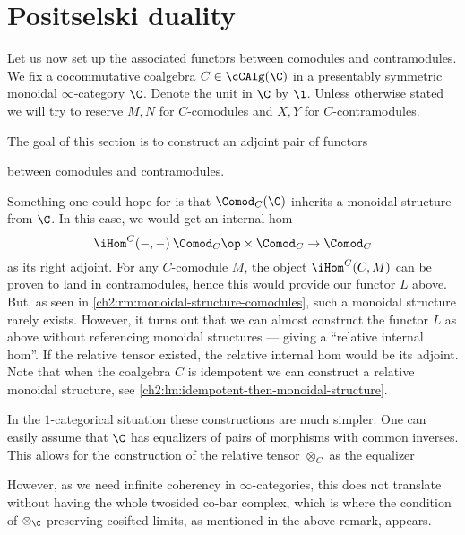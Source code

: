 

\section{Positselski duality}

Let us now set up the associated functors between comodules and contramodules. We fix a cocommutative coalgebra $C\in \cCAlg(\C)$ in a presentably symmetric monoidal $\infty$-category $\C$. Denote the unit in $\C$ by $\1$. Unless otherwise stated we will try to reserve $M, N$ for $C$-comodules and $X, Y$ for $C$-contramodules. 

The goal of this section is to construct an adjoint pair of functors
\begin{center}
\end{center}
between comodules and contramodules. 


\begin{remark}
    Something one could hope for is that $\Comod_C(\C)$ inherits a monoidal structure from $\C$. In this case, we would get an internal hom 
    \[\iHom^C(-,-)\:\Comod_C\op\times \Comod_C\to \Comod_C \]
    as its right adjoint. For any $C$-comodule $M$, the object $\iHom^C(C,M)$ can be proven to land in contramodules, hence this would provide our functor $L$ above. But, as seen in \cref{ch2:rm:monoidal-structure-comodules}, such a monoidal structure rarely exists.   However, it turns out that we can almost construct the functor $L$ as above without referencing monoidal structures --- giving a ``relative internal hom''. If the relative tensor existed, the relative internal hom would be its adjoint. Note that when the coalgebra $C$ is idempotent we can construct a relative monoidal structure, see \cref{ch2:lm:idempotent-then-monoidal-structure}. 
\end{remark}

\begin{remark}
    In the $1$-categorical situation these constructions are much simpler. One can easily assume that $\C$ has equalizers of pairs of morphisms with common inverses. This allows for the construction of the relative tensor $\otimes_C$ as the equalizer
    \begin{center}
    \end{center}
    However, as we need infinite coherency in $\infty$-categories, this does not translate without having the whole twosided co-bar complex, which is where the condition of $\otimes_\C$ preserving cosifted limits, as mentioned in the above remark, appears.    
\end{remark}




